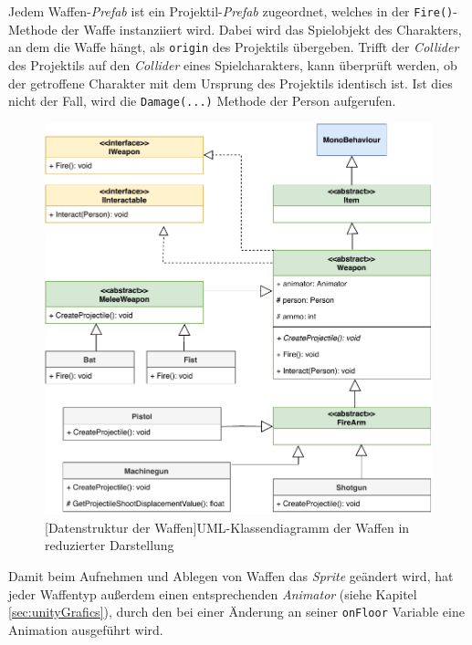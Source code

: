 Jedem Waffen-\textit{Prefab} ist ein Projektil-\textit{Prefab} zugeordnet, welches in der \texttt{Fire()}-Methode der Waffe instanziiert wird. Dabei wird das Spielobjekt des Charakters, an dem die Waffe hängt, als \texttt{origin} des Projektils übergeben. Trifft der \textit{Collider} des Projektils auf den \textit{Collider} eines Spielcharakters, kann überprüft werden, ob der getroffene Charakter mit dem Ursprung des Projektils identisch ist. Ist dies nicht der Fall, wird die \texttt{Damage(...)} Methode der Person aufgerufen.

\begin{figure}[h]
 \centering
 \includegraphics[width=0.835\linewidth]{diagrams/Weapon_Structure_reduced.pdf}
 [Datenstruktur der Waffen]{UML-Klassendiagramm der Waffen in reduzierter Darstellung}
	\label{fig:weaponStructure}
\end{figure}

Damit beim Aufnehmen und Ablegen von Waffen das \textit{Sprite} geändert wird, hat jeder Waffentyp außerdem einen entsprechenden \textit{Animator} (siehe Kapitel \ref{sec:unityGrafics}), durch den bei einer Änderung an seiner \texttt{onFloor} Variable eine Animation ausgeführt wird.
